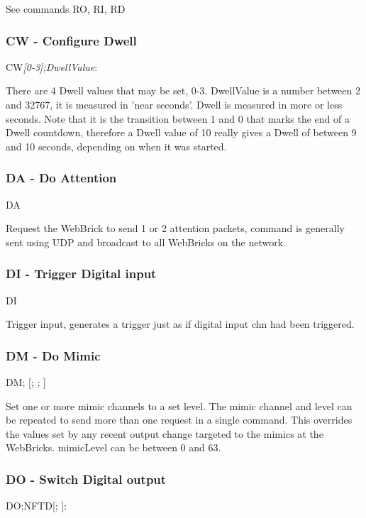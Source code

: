 See commands RO, RI, RD

\subsubsection{CW - Configure Dwell}
CW{\it [0-3];DwellValue}:

There are 4 Dwell values that may be set, 0-3.
DwellValue is a number between 2 and 32767, it is measured in 'near seconds'.
Dwell is measured in more or less seconds.
Note that it is the transition between 1 and 0 that marks the end of a Dwell countdown, 
therefore a Dwell value of 10 really gives a Dwell of between 9 and 10 seconds, depending on
when it was started.

\subsubsection{DA - Do Attention}
DA

Request the WebBrick to send 1 or 2 attention packets, command is generally sent using UDP and broadcast
to all WebBricks on the network.

\subsubsection{DI - Trigger Digital input}
DI

Trigger input, generates a trigger just as if digital input chn had been triggered.

\subsubsection{DM - Do Mimic}
DM; [; ; ]

Set one or more mimic channels to a set level. The mimic channel and level can be repeated to send more than one
request in a single command. This overrides the values set by any recent output change targeted to the mimics
at the WebBricks. mimicLevel can be between 0 and 63.

\subsubsection{DO - Switch Digital output}
DO;N\textbar{}F\textbar{}T\textbar{}D[; ]:

